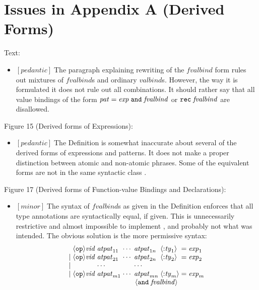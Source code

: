 \documentclass{article}
\newcommand{\m}[1]{$[\mathit{#1}]\;$}
\newcommand{\minor}{\m{minor}}
\newcommand{\pedantic}{\m{pedantic}}
\begin{document}
\section{Issues in Appendix A (Derived Forms)}
\label{bugsappendixa}

Text:
\nopagebreak

\begin{itemize}
\item \pedantic The paragraph explaining rewriting of the $\mathit{fvalbind}$ form rules out mixtures of $\mathit{fvalbind}$s and ordinary $\mathit{valbind}$s. However, the way it is formulated it does not rule out all combinations. It should rather say that all value bindings of the form $\mathit{pat}\;{\tt=}\;\mathit{exp}\;{\tt and}\;\mathit{fvalbind}$ or ${\tt rec}\;\mathit{fvalbind}$ are disallowed.
\end{itemize}


Figure 15 (Derived forms of Expressions):
\nopagebreak

\begin{itemize}
\item \pedantic The Definition is somewhat inaccurate about several of the derived forms of expressions and patterns. It does not make a proper distinction between atomic and non-atomic phrases. Some of the equivalent forms are not in the same syntactic class \cite{commentary, mistakes}.
\end{itemize}


Figure 17 (Derived forms of Function-value Bindings and Declarations):
\nopagebreak

\begin{itemize}
\item \minor The syntax of $\mathit{fvalbind}$s as given in the Definition enforces that all type annotations are syntactically equal, if given. This is unnecessarily restrictive and almost impossible to implement \cite{mistakes}, and probably not what was intended. The obvious solution is the more permissive syntax:
\begin{displaymath}
\begin{array}{l@{\;}l@{\;}l@{\;}l@{\;}l@{\;}l@{\;}l@{\;}l}
& \langle{\tt{op}}\rangle\mathit{vid} & \mathit{atpat}_{11} & \cdots & \mathit{atpat}_{1n} & \langle{\tt:}\mathit{ty}_1\rangle &{\tt =}& \mathit{exp}_1 \\
{\tt|} & \langle{\tt{op}}\rangle\mathit{vid} & \mathit{atpat}_{21} & \cdots & \mathit{atpat}_{2n} & \langle{\tt:}\mathit{ty}_2\rangle &{\tt =}& \mathit{exp}_2 \\
{\tt|} & & \cdots & & \cdots \\
{\tt|} & \langle{\tt{op}}\rangle\mathit{vid} & \mathit{atpat}_{m1} & \cdots & \mathit{atpat}_{mn} & \langle{\tt:}\mathit{ty}_m\rangle &{\tt =}& \mathit{exp}_m \\
\multicolumn{6}{r}{\langle {\tt and} \; \mathit{fvalbind} \rangle}
\end{array}
\end{displaymath}
\end{itemize}
\end{document}
